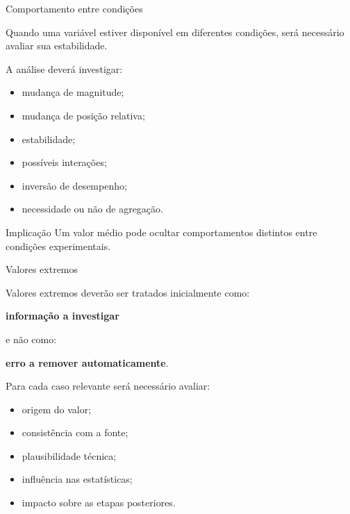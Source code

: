 \begin{frame}{Comportamento entre condições}

    Quando uma variável estiver disponível em diferentes condições,
    será necessário avaliar sua estabilidade.

    \vspace{0.3cm}

    A análise deverá investigar:

    \begin{itemize}
        \item mudança de magnitude;
        \item mudança de posição relativa;
        \item estabilidade;
        \item possíveis interações;
        \item inversão de desempenho;
        \item necessidade ou não de agregação.
    \end{itemize}

    \vspace{0.3cm}

    \begin{block}{Implicação}
        Um valor médio pode ocultar comportamentos distintos entre
        condições experimentais.
    \end{block}

\end{frame}



\begin{frame}{Valores extremos}

    Valores extremos deverão ser tratados inicialmente como:

    \begin{center}
        \textbf{informação a investigar}
    \end{center}

    e não como:

    \begin{center}
        \textbf{erro a remover automaticamente}.
    \end{center}

    \vspace{0.3cm}

    Para cada caso relevante será necessário avaliar:

    \begin{itemize}
        \item origem do valor;
        \item consistência com a fonte;
        \item plausibilidade técnica;
        \item influência nas estatísticas;
        \item impacto sobre as etapas posteriores.
    \end{itemize}

\end{frame}


